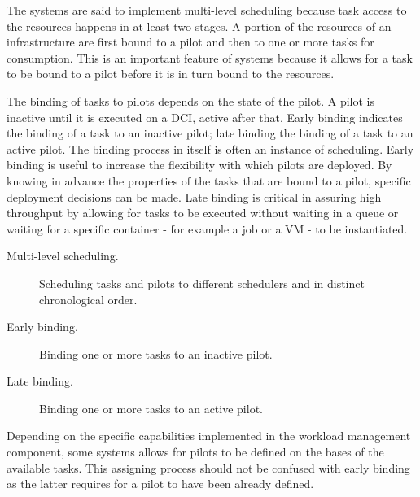 \documentclass{sig-alternate}
\begin{document}
The \pilotjob systems are said to implement multi-level scheduling
because task access  to the resources happens in
at least two stages. A portion of the resources of an infrastructure
are first bound to a pilot and then to one or more tasks for
consumption. This is an important feature of \pilotjob systems because
it allows for a task to be bound to a pilot before it is in turn bound
to the resources.

The binding of tasks to pilots depends on the state of the pilot. A
pilot is inactive until it is executed on a DCI, active after
that. Early binding indicates the binding of a task to an inactive
pilot; late binding the binding of a task to an active pilot. The
binding process in itself is often an instance of scheduling. Early
binding is useful to increase the flexibility with which pilots are
deployed. By knowing in advance the properties of the tasks that are
bound to a pilot, specific deployment decisions can be made. Late
binding is critical in assuring high throughput by allowing for tasks
to be executed without waiting in a queue or waiting for a specific
container - for example a job or a VM - to be instantiated.


\begin{description}
\item[Multi-level scheduling.] Scheduling tasks and pilots to
  different schedulers and in distinct chronological order.
  \item[Early binding.] Binding one or more tasks to an inactive pilot.
  \item[Late binding.] Binding one or more tasks to an active pilot.
\end{description}

Depending on the specific capabilities implemented in the workload
management component, some \pilotjob systems allows for pilots to be
defined  on the bases of
the available tasks. This assigning process should not be confused
with early binding as the latter requires for a pilot to have been
already defined.

\end{document}
